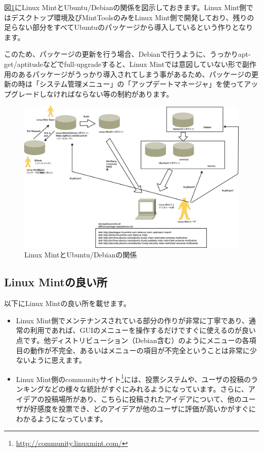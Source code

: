 \documentclass[mingoth,a4paper]{jsarticle}
\begin{document}
 図\ref{fig:mint-construct}にLinux MintとUbuntu/Debianの関係を図示しておきます。Linux Mint側ではデスクトップ環境及びMintToolsのみをLinux Mint側で開発しており、残りの足らない部分をすべてUbuntuのパッケージから導入しているという作りとなります。

 このため、パッケージの更新を行う場合、Debianで行うように、うっかりapt-get/aptitudeなどでfull-upgradeすると、Linux Mintでは意図していない形で副作用のあるパッケージがうっかり導入されてしまう事があるため、パッケージの更新の時は「システム管理メニュー」の「アップデートマネージャ」を使ってアップグレードしなければならない等の制約があります。
\begin{figure}[H]
\centering
\includegraphics[width=0.8\hsize]{image201412/mint-construct.eps}  
\caption{Linux MintとUbuntu/Debianの関係}\label{fig:mint-construct}
\end{figure} 

\subsection{Linux Mintの良い所} 

以下にLinux Mintの良い所を載せます。

\begin{itemize}
 \item Linux Mint側でメンテナンスされている部分の作りが非常に丁寧であり、通常の利用であれば、GUIのメニューを操作するだけですぐに使えるのが良い点です。他ディストリビューション（Debian含む）のようにメニューの各項目の動作が不完全、あるいはメニューの項目が不完全ということは非常に少ないように思えます。
 \item Linux Mint側のcommunityサイト\footnote{\url{http://community.linuxmint.com/}}には、投票システムや、ユーザの投稿のランキングなどの様々な統計がすぐにみれるようになっています。さらに、アイデアの投稿場所があり、こちらに投稿されたアイデアについて、他のユーザが好感度を投票でき、どのアイデアが他のユーザに評価が高いかがすぐにわかるようになっています。
\end{itemize}
\end{document}
